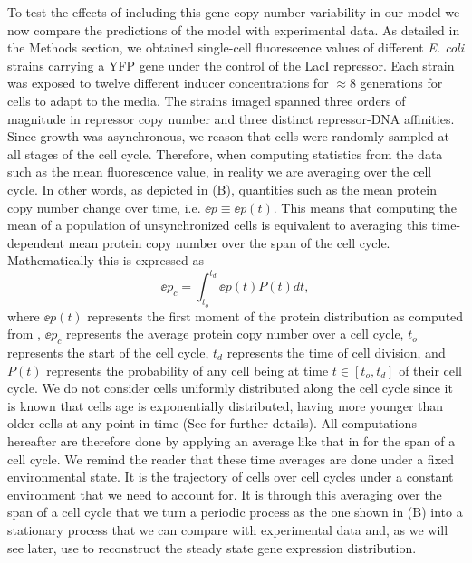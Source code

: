 To test the effects of including this gene copy number variability in our model
we now compare the predictions of the model with experimental data. As detailed
in the Methods section, we obtained single-cell fluorescence values of
different {\it E. coli} strains carrying a YFP gene under the control of the
LacI repressor. Each strain was exposed to twelve different inducer
concentrations for $\approx 8$ generations for cells to adapt to the media. The
strains imaged spanned three orders of magnitude in repressor copy number and
three distinct repressor-DNA affinities. Since growth was asynchronous, we
reason that cells were randomly sampled at all stages of the cell cycle.
Therefore, when computing statistics from the data such as the mean fluorescence
value, in reality we are averaging over the cell cycle. In other words, as
depicted in (B), quantities such as the mean protein copy
number change over time, i.e. $\ee{p} \equiv \ee{p(t)}$. This means that
computing the mean of a population of unsynchronized cells is equivalent to
averaging this time-dependent mean protein copy number over the span of the cell
cycle. Mathematically this is expressed as
\begin{equation}
	\ee{p}_c = \int_{t_o}^{t_d} \ee{p(t)} P(t) dt,
	\label{eq_time_avg}
\end{equation}
where $\ee{p(t)}$ represents the first moment of the protein distribution as
computed from , $\ee{p}_c$ represents the average protein
copy number over a cell cycle, $t_o$ represents the start of the cell cycle,
$t_d$ represents the time of cell division, and $P(t)$ represents the
probability of any cell being at time $t \in [t_o, t_d]$ of their cell cycle.
We do not consider cells uniformly distributed along the cell cycle since it is
known that cells age is exponentially distributed, having more younger than
older cells at any point in time \cite{Powell1956} (See
 for further details). All computations hereafter are
therefore done by applying an average like that in  for the
span of a cell cycle. We remind the reader that these time averages are done
under a fixed environmental state. It is the trajectory of cells over cell
cycles under a constant environment that we need to account for. It is through
this averaging over the span of a cell cycle that we turn a periodic process as
the one shown in (B) into a stationary process that we can
compare with experimental data and, as we will see later, use to reconstruct the
steady state gene expression distribution.

